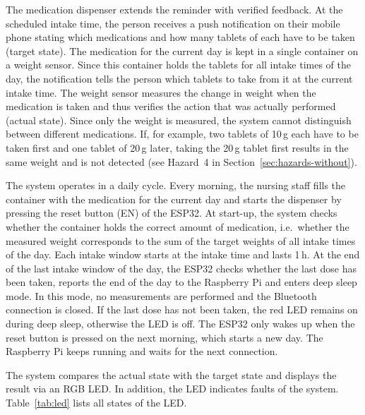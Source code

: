 The medication dispenser extends the reminder with verified feedback. At the
scheduled intake time, the person receives a push notification on their mobile
phone stating which medications and how many tablets of each have to be
taken (target state). The medication for the current day is
kept in a single container on a weight sensor. Since this container holds the
tablets for all intake times of the day, the notification tells the person
which tablets to take from it at the current intake time.
The weight sensor measures the change in weight when the medication is taken
and thus verifies the action that was actually performed (actual state).
Since only the weight is measured, the system cannot distinguish between
different medications. If, for example, two tablets of 10\,g each have to be
taken first and one tablet of 20\,g later, taking the 20\,g tablet first results
in the same weight and is not detected (see Hazard~4 in
Section~\ref{sec:hazards-without}).

The system operates in a daily cycle. Every morning, the nursing staff fills
the container with the medication for the current day and starts the dispenser
by pressing the reset button (EN) of the ESP32. At start-up, the system checks whether
the container holds the correct amount of medication, i.e.\ whether the
measured weight corresponds to the sum of the target weights of all intake
times of the day. Each intake window starts at the intake time and lasts 1\,h.
At the end of the last intake window of the day, the ESP32 checks whether the
last dose has been taken, reports the end of the day to the Raspberry Pi and
enters deep sleep mode. In this mode, no measurements are performed and the
Bluetooth connection is closed. If the last dose has not been taken, the red LED
remains on during deep sleep, otherwise the LED is off. The ESP32 only wakes up
when the reset button is pressed on the next morning, which starts a new day.
The Raspberry Pi keeps running and waits for the next connection.

The system compares the actual state with the target state and displays the
result via an RGB LED. In addition, the LED indicates faults of the system.
Table~\ref{tab:led} lists all states of the LED.

